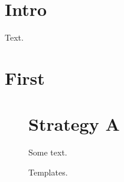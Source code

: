 \documentclass{article}
\begin{document}
\section{Intro}
Text.
\appendix
\section{First}
\begin{figure}
\begin{minipage}[t]{0.45\textwidth}
\section*{Strategy A}
Some text.
\end{minipage}
\caption{Templates.}
\end{figure}
\end{document}
